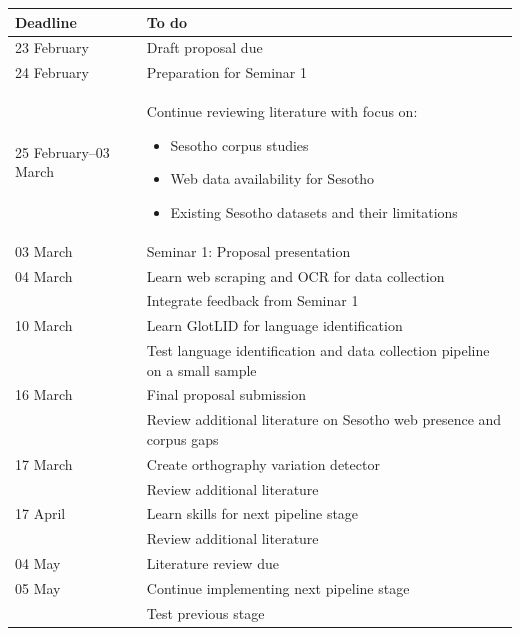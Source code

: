 \documentclass[11pt,a4paper]{article}
\begin{document}
\begin{tabular}{p{3cm}|p{10cm}}
\toprule
\textbf{Deadline} & \textbf{To do} \\
\midrule

23 February & Draft proposal due \\

24 February & Preparation for Seminar 1 \\

25 February--03 March &
\parbox[t]{10cm}{
Continue reviewing literature with focus on:
\begin{itemize}[leftmargin=*, nosep]
    \item Sesotho corpus studies
    \item Web data availability for Sesotho
    \item Existing Sesotho datasets and their limitations
\end{itemize}
} \\

03 March & Seminar 1: Proposal presentation \\

04 March & Learn web scraping and OCR for data collection \\
         & Integrate feedback from Seminar 1 \\

10 March & Learn GlotLID for language identification \\
         & Test language identification and data collection pipeline on a small sample \\

16 March & Final proposal submission \\
         & Review additional literature on Sesotho web presence and corpus gaps \\

17 March & Create orthography variation detector \\
         & Review additional literature \\

17 April & Learn skills for next pipeline stage \\
         & Review additional literature \\

04 May & Literature review due \\

05 May & Continue implementing next pipeline stage \\
       & Test previous stage \\


\end{tabular}
\end{document}
